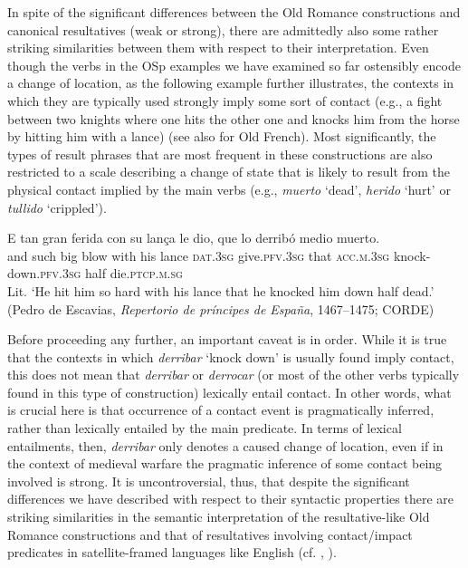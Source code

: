 \documentclass[output=paper,colorlinks,citecolor=brown,
]{langscibook}
\begin{document}
In spite of the significant differences between the Old Romance constructions and canonical resultatives (weak or strong), there are admittedly also some rather striking similarities between them with respect to their interpretation. Even though the verbs in the OSp examples we have examined so far ostensibly encode a change of location, as the following example further illustrates, the contexts in which they are typically used strongly imply some sort of contact (e.g., a fight between two knights where one hits the other one and knocks him from the horse by hitting him with a lance) (see also \citet{trobergburnett} for Old French). Most significantly, the types of result phrases that are most frequent in these constructions are also restricted to a scale describing a change of state that is likely to result from the physical contact implied by the main verbs (e.g., \textit{muerto} `dead’, \textit{herido} `hurt’ or \textit{tullido} `crippled’).

\ea
  \gll  E tan gran ferida con su lança le dio, que lo derribó medio muerto.\\
and such big blow with his lance \textsc{dat}.\textsc{3sg} give.\textsc{pfv}.\textsc{3sg} that \textsc{acc}.\textsc{m}.\textsc{3sg} knock-down.\textsc{pfv}.\textsc{3sg} half die.\textsc{ptcp}.\textsc{m}.\textsc{sg}\\
  \glt Lit. `He hit him so hard with his lance that he knocked him down half dead.' (Pedro de Escavias, \textit{Repertorio de príncipes de España}, 1467--1475; CORDE)
\z  

Before proceeding any further, an important caveat is in order. While it is true that the contexts in which \textit{derribar} `knock down' is usually found imply contact, this does not mean that \textit{derribar} or  \textit{derrocar} (or most of the other verbs typically found in this type of construction) lexically entail contact. In other words, what is crucial here is that occurrence of a contact event is pragmatically inferred, rather than lexically entailed by the main predicate. In terms of lexical entailments, then, \textit{derribar} only denotes a caused change of location, even if in the context of medieval warfare the pragmatic inference of some contact being involved is strong. It is uncontroversial, thus, that despite the significant differences we have described with respect to their syntactic properties there are striking similarities in the semantic interpretation of the resultative-like Old Romance constructions and that of resultatives involving contact/impact predicates in satellite-framed languages like English (cf. \citealt{Boas2003}, \citealt{Beavers2011}). 
\end{document}

